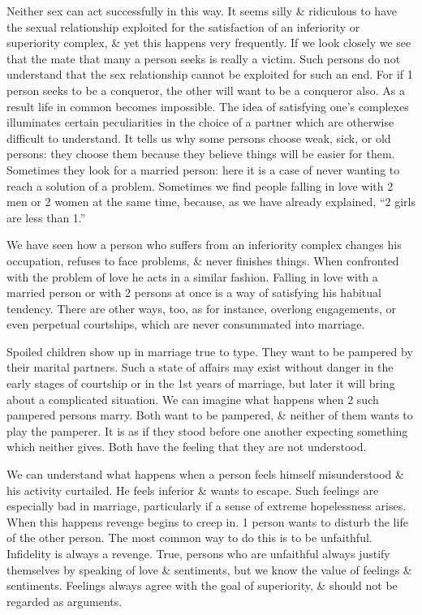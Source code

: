 \documentclass{article}
\begin{document}
Neither sex can act successfully in this way. It seems silly \& ridiculous to have the sexual relationship exploited for the satisfaction of an inferiority or superiority complex, \& yet this happens very frequently. If we look closely we see that the mate that many a person seeks is really a victim. Such persons do not understand that the sex relationship cannot be exploited for such an end. For if 1 person seeks to be a conqueror, the other will want to be a conqueror also. As a result life in common becomes impossible. The idea of satisfying one's complexes illuminates certain peculiarities in the choice of a partner which are otherwise difficult to understand. It tells us why some persons choose weak, sick, or old persons: they choose them because they believe things will be easier for them. Sometimes they look for a married person: here it is a case of never wanting to reach a solution of a problem. Sometimes we find people falling in love with 2 men or 2 women at the same time, because, as we have already explained, ``2 girls are less than 1.''

We have seen how a person who suffers from an inferiority complex changes his occupation, refuses to face problems, \& never finishes things. When confronted with the problem of love he acts in a similar fashion. Falling in love with a married person or with 2 persons at once is a way of satisfying his habitual tendency. There are other ways, too, as for instance, overlong engagements, or even perpetual courtships, which are never consummated into marriage.

Spoiled children show up in marriage true to type. They want to be pampered by their marital partners. Such a state of affairs may exist without danger in the early stages of courtship or in the 1st years of marriage, but later it will bring about a complicated situation. We can imagine what happens when 2 such pampered persons marry. Both want to be pampered, \& neither of them wants to play the pamperer. It is as if they stood before one another expecting something which neither gives. Both have the feeling that they are not understood.

We can understand what happens when a person feels himself misunderstood \& his activity curtailed. He feels inferior \& wants to escape. Such feelings are especially bad in marriage, particularly if a sense of extreme hopelessness arises. When this happens revenge begins to creep in. 1 person wants to disturb the life of the other person. The most common way to do this is to be unfaithful. Infidelity is always a revenge. True, persons who are unfaithful always justify themselves by speaking of love \& sentiments, but we know the value of feelings \& sentiments. Feelings always agree with the goal of superiority, \& should not be regarded as arguments.
\end{document}
